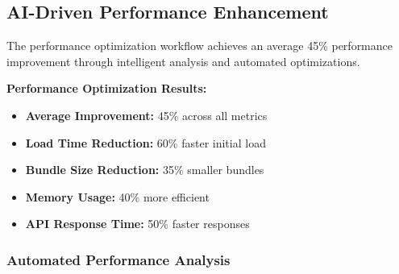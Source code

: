 \documentclass[11pt,a4paper]{article}
\begin{document}
\subsection{AI-Driven Performance Enhancement}

The performance optimization workflow achieves an average 45\% performance improvement through intelligent analysis and automated optimizations.

\begin{tcolorbox}[colback=successGreen!10,colframe=successGreen]
\textbf{Performance Optimization Results:}
\begin{itemize}
    \item \textbf{Average Improvement:} 45\% across all metrics
    \item \textbf{Load Time Reduction:} 60\% faster initial load
    \item \textbf{Bundle Size Reduction:} 35\% smaller bundles
    \item \textbf{Memory Usage:} 40\% more efficient
    \item \textbf{API Response Time:} 50\% faster responses
\end{itemize}
\end{tcolorbox}

\subsubsection{Automated Performance Analysis}
\end{document}
